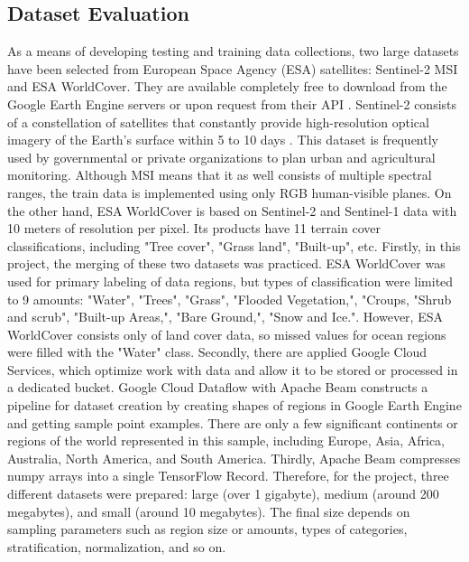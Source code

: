 \documentclass[3p,times,procedia]{elsarticle}
\begin{document}
\subsection{Dataset Evaluation}
As a means of developing testing and training data collections, two large datasets have been selected from European Space Agency (ESA) satellites: Sentinel-2 MSI and ESA WorldCover. They are available completely free to download from the Google Earth Engine servers or upon request from their API \cite{Bennett2020}. Sentinel-2 consists of a constellation of satellites that constantly provide high-resolution optical imagery of the Earth's surface within 5 to 10 days \cite{Phiri2020}. This dataset is frequently used by governmental or private organizations to plan urban and agricultural monitoring. Although MSI means that it as well consists of multiple spectral ranges, the train data is implemented using only RGB human-visible planes. On the other hand, ESA WorldCover is based on Sentinel-2 and Sentinel-1 data with 10 meters of resolution per pixel. Its products have 11 terrain cover classifications, including "Tree cover", "Grass land", "Built-up", etc. Firstly, in this project, the merging of these two datasets was practiced. ESA WorldCover was used for primary labeling of data regions, but types of classification were limited to 9 amounts: "Water", "Trees", "Grass", "Flooded Vegetation,", "Croups, "Shrub and scrub", "Built-up Areas,", "Bare Ground,", "Snow and Ice.". However, ESA WorldCover consists only of land cover data, so missed values for ocean regions were filled with the "Water" class. Secondly, there are applied Google Cloud Services, which optimize work with data and allow it to be stored or processed in a dedicated bucket. Google Cloud Dataflow with Apache Beam constructs a pipeline for dataset creation by creating shapes of regions in Google Earth Engine and getting sample point examples. There are only a few significant continents or regions of the world represented in this sample, including Europe, Asia, Africa, Australia, North America, and South America. Thirdly, Apache Beam compresses numpy arrays into a single TensorFlow Record. Therefore, for the project, three different datasets were prepared: large (over 1 gigabyte), medium (around 200 megabytes), and small (around 10 megabytes). The final size depends on sampling parameters such as region size or amounts, types of categories, stratification, normalization, and so on.
\end{document}
